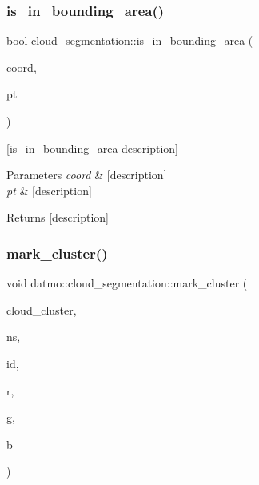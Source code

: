 \mbox{\label{classdatmo_1_1cloud__segmentation_a5bcf85ac924671c64840ac2087877a5f}} 
\subsubsection{\texorpdfstring{is\+\_\+in\+\_\+bounding\+\_\+area()}{is\_in\_bounding\_area()}}
{\footnotesize\ttfamily bool cloud\+\_\+segmentation\+::is\+\_\+in\+\_\+bounding\+\_\+area (\begin{DoxyParamCaption}\item[{const pcl\+::\+Point\+Cloud$<$ pcl\+::\+Point\+X\+YZ $>$\+::Ptr \&}]{coord,  }\item[{pcl\+::\+Point\+X\+Y\+Z\+R\+GB}]{pt }\end{DoxyParamCaption})\hspace{0.3cm}{\ttfamily [private]}}

\mbox{[}is\+\_\+in\+\_\+bounding\+\_\+area description\mbox{]} 
\begin{DoxyParams}{Parameters}
{\em coord} & \mbox{[}description\mbox{]} \\
\hline
{\em pt} & \mbox{[}description\mbox{]} \\
\hline
\end{DoxyParams}
\begin{DoxyReturn}{Returns}
\mbox{[}description\mbox{]} 
\end{DoxyReturn}
\mbox{\label{classdatmo_1_1cloud__segmentation_a77ecff192bbc43fd3182acb675d43350}} 
\subsubsection{\texorpdfstring{mark\+\_\+cluster()}{mark\_cluster()}}
{\footnotesize\ttfamily void datmo\+::cloud\+\_\+segmentation\+::mark\+\_\+cluster (\begin{DoxyParamCaption}\item[{pcl\+::\+Point\+Cloud$<$ pcl\+::\+Point\+X\+Y\+Z\+R\+GB $>$\+::Ptr}]{cloud\+\_\+cluster,  }\item[{std\+::string}]{ns,  }\item[{int}]{id,  }\item[{float}]{r,  }\item[{float}]{g,  }\item[{float}]{b }\end{DoxyParamCaption})\hspace{0.3cm}{\ttfamily [private]}}

